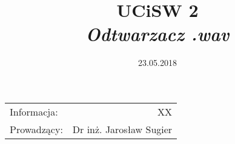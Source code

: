 \documentclass{article}
\title{UCiSW 2 \\ \textit{Odtwarzacz .wav}} %
\date{23.05.2018} %
\begin{document}
\maketitle %

\begin{center}
\begin{tabular}{l r}
Informacja: & XX  \\ %
Prowadzący: & Dr inż. Jarosław Sugier
\end{tabular}
\end{center}

\tableofcontents %







\end{document}
